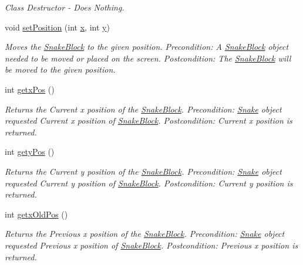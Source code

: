 \begin{DoxyCompactItemize}
\begin{DoxyCompactList}\small\item\em \-Class \-Destructor -\/ \-Does \-Nothing. \end{DoxyCompactList}\item 
void \hyperlink{classSnakeBlock_a6e5291dffd6e314250491d531d35894a}{set\-Position} (int \hyperlink{classSnakeBlock_ae4bcb05c48c77bff73282652a5f91b42}{x}, int \hyperlink{classSnakeBlock_a25b60c36f8e84c5af37bdf48a078fec0}{y})
\begin{DoxyCompactList}\small\item\em \-Moves the \hyperlink{classSnakeBlock}{\-Snake\-Block} to the given position. \-Precondition\-: \-A \hyperlink{classSnakeBlock}{\-Snake\-Block} object needed to be moved or placed on the screen. \-Postcondition\-: \-The \hyperlink{classSnakeBlock}{\-Snake\-Block} will be moved to the given position. \end{DoxyCompactList}\item 
int \hyperlink{classSnakeBlock_a73a38f952998688e6c899ae1fcba4df9}{getx\-Pos} ()
\begin{DoxyCompactList}\small\item\em \-Returns the \-Current x position of the \hyperlink{classSnakeBlock}{\-Snake\-Block}. \-Precondition\-: \hyperlink{classSnake}{\-Snake} object requested \-Current x position of \hyperlink{classSnakeBlock}{\-Snake\-Block}. \-Postcondition\-: \-Current x position is returned. \end{DoxyCompactList}\item 
int \hyperlink{classSnakeBlock_ab78190ae3b87cd4556b90aeaf8fab811}{gety\-Pos} ()
\begin{DoxyCompactList}\small\item\em \-Returns the \-Current y position of the \hyperlink{classSnakeBlock}{\-Snake\-Block}. \-Precondition\-: \hyperlink{classSnake}{\-Snake} object requested \-Current y position of \hyperlink{classSnakeBlock}{\-Snake\-Block}. \-Postcondition\-: \-Current y position is returned. \end{DoxyCompactList}\item 
int \hyperlink{classSnakeBlock_a29958e8110acd215354f0b07cdd7c606}{getx\-Old\-Pos} ()
\begin{DoxyCompactList}\small\item\em \-Returns the \-Previous x position of the \hyperlink{classSnakeBlock}{\-Snake\-Block}. \-Precondition\-: \hyperlink{classSnake}{\-Snake} object requested \-Previous x position of \hyperlink{classSnakeBlock}{\-Snake\-Block}. \-Postcondition\-: \-Previous x position is returned. \end{DoxyCompactList}\item 

\end{DoxyCompactItemize}
